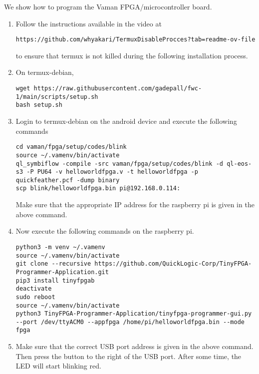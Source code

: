 We show how to program the Vaman FPGA/microcontroller board.  


%
%
\begin{enumerate}[label=\arabic*.,ref=\theenumi]
	\item Follow the instructions available in the video at
\begin{lstlisting}
https://github.com/whyakari/TermuxDisableProcces?tab=readme-ov-file
\end{lstlisting}
to ensure that termux is not killed during the following installation process.
\item On termux-debian,
\begin{lstlisting}
wget https://raw.githubusercontent.com/gadepall/fwc-1/main/scripts/setup.sh
bash setup.sh
\end{lstlisting}
%
\item Login to termux-debian on the android device and execute the following commands
\begin{lstlisting}
cd vaman/fpga/setup/codes/blink
source ~/.vamenv/bin/activate
ql_symbiflow -compile -src vaman/fpga/setup/codes/blink -d ql-eos-s3 -P PU64 -v helloworldfpga.v -t helloworldfpga -p quickfeather.pcf -dump binary
scp blink/helloworldfpga.bin pi@192.168.0.114:
\end{lstlisting}
Make sure that the appropriate IP address for the raspberry pi is given in the above command.
\item Now execute the following commands on the raspberry pi.
\begin{lstlisting}
python3 -m venv ~/.vamenv
source ~/.vamenv/bin/activate
git clone --recursive https://github.com/QuickLogic-Corp/TinyFPGA-Programmer-Application.git
pip3 install tinyfpgab
deactivate
sudo reboot
source ~/.vamenv/bin/activate
python3 TinyFPGA-Programmer-Application/tinyfpga-programmer-gui.py --port /dev/ttyACM0 --appfpga /home/pi/helloworldfpga.bin --mode fpga
\end{lstlisting}
\item Make sure that the correct USB port address is given in the above command.  Then press the button to the right of the USB port.  After some time, the LED will start blinking red.

\end{enumerate}
